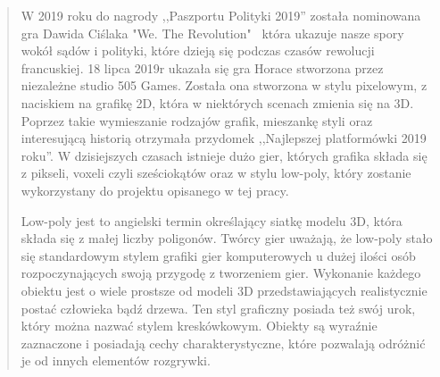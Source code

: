 \begin{quotation}
\indent W 2019 roku do nagrody ,,Paszportu Polityki 2019'' została nominowana gra Dawida Ciślaka "We. The Revolution" ~która ukazuje nasze spory wokół sądów i polityki, które dzieją się podczas czasów rewolucji francuskiej. 18 lipca 2019r ukazała się gra Horace stworzona przez niezależne studio 505 Games. Została ona stworzona w stylu pixelowym, z naciskiem na grafikę 2D, która w niektórych scenach zmienia się na 3D. Poprzez takie wymieszanie rodzajów grafik, mieszankę styli oraz interesującą historią otrzymała przydomek ,,Najlepszej platformówki 2019 roku''. W dzisiejszych czasach istnieje dużo gier, których grafika składa się z pikseli, voxeli czyli sześciokątów oraz w stylu low-poly, który zostanie wykorzystany do projektu opisanego w tej pracy.

\indent Low-poly jest to angielski termin określający siatkę modelu 3D, która składa się z małej liczby poligonów. Twórcy gier uważają, że low-poly stało się standardowym stylem grafiki gier komputerowych u dużej ilości osób rozpoczynających swoją przygodę z tworzeniem gier. Wykonanie każdego obiektu jest o wiele prostsze od modeli 3D przedstawiających realistycznie postać człowieka bądź drzewa. Ten styl graficzny posiada też swój urok, który można nazwać stylem kreskówkowym. Obiekty są wyraźnie zaznaczone i posiadają cechy charakterystyczne, które pozwalają odróżnić je od innych elementów rozgrywki.
\end{quotation}
